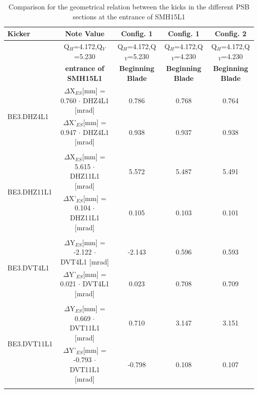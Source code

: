 \documentclass[11pt,letter,english]{article}
\begin{document}
\begin{table}

  \caption{
    Comparison for the geometrical relation between the kicks in the different PSB sections at the entrance of SMH15L1
    }

  \label{tab:geom_rel}

  \begin{tabular}{ |l|c|c|c|c| }\hline
  Kicker & Note Value               & Config. 1                & Config. 1                & Config. 2               \\ \hline
         & Q$_H$=4.172,Q$_V$=5.230  & Q$_H$=4.172,Q$_V$=5.230  & Q$_H$=4.172,Q$_V$=4.230  & Q$_H$=4.172,Q$_V$=4.230 \\ \hline
         & {\bf entrance of SMH15L1}             & {\bf Beginning Blade}                 & {\bf Beginning Blade}                 & {\bf Beginning Blade}                 \\ \hline

  \multirow{2}{*}{BE3.DHZ4L1} & $\Delta$X$_{ES}$[mm]  = 0.760 $\cdot$ DHZ4L1 [mrad] & 0.786 & 0.768 & 0.764 \\  \cline{2-5}
                              & $\Delta$X'$_{ES}$[mm] = 0.947 $\cdot$ DHZ4L1 [mrad] & 0.938 & 0.937 & 0.938 \\  \hline      
  \multicolumn{5}{|c|}{}        \\ \hline

  \multirow{2}{*}{BE3.DHZ11L1} & $\Delta$X$_{ES}$[mm]  = 5.615 $\cdot$ DHZ11L1 [mrad] & 5.572 & 5.487 & 5.491 \\ \cline{2-5} 
                               & $\Delta$X'$_{ES}$[mm] = 0.104 $\cdot$ DHZ11L1 [mrad] & 0.105 & 0.103 & 0.101 \\ \hline      
 \multicolumn{5}{|c|}{} \\ \hline

 \multirow{2}{*}{BE3.DVT4L1} & $\Delta$Y$_{ES}$[mm]  = -2.122 $\cdot$ DVT4L1 [mrad] & -2.143 & 0.596 & 0.593 \\  \cline{2-5}  
                             & $\Delta$Y'$_{ES}$[mm] =  0.021 $\cdot$ DVT4L1 [mrad] &  0.023 & 0.708 & 0.709 \\  \hline       
 \multicolumn{5}{|c|}{} \\ \hline

 \multirow{2}{*}{BE3.DVT11L1} & $\Delta$Y$_{ES}$[mm]  =  0.669 $\cdot$ DVT11L1 [mrad] &  0.710 & 3.147 & 3.151 \\ \cline{2-5}  
                              & $\Delta$Y'$_{ES}$[mm] = -0.793 $\cdot$ DVT11L1 [mrad] & -0.798 & 0.108 & 0.107 \\ \hline       
 \multicolumn{5}{|c|}{} \\ \hline

\end{tabular}
\end{table}
\end{document}
